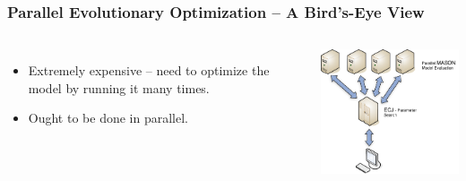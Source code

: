 \documentclass{beamer}
\begin{document}
\begin{frame}
	\frametitle{Parallel Evolutionary Optimization -- A Bird's-Eye View}
	\begin{columns}[c]
	\column{2in}
			\begin{itemize}
			\setlength{\itemsep}{20pt}
				\item Extremely expensive -- need to optimize the model by running it many times.
				\item Ought to be done in parallel.	
			\end{itemize}
	\column{3in}
		\centering
		\includegraphics[width=2.5in,keepaspectratio]{master-slave.pdf}	
	\end{columns}
\end{frame}

\end{document}

